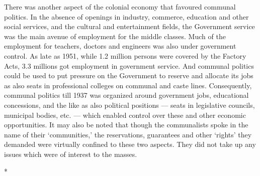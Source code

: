 There was another aspect of the colonial economy that favoured communal politics. In the absence of openings in industry, commerce, education and other social services, and the cultural and entertainment fields, the Government service was the main avenue of employment for the middle classes. Much of the employment for teachers, doctors and engineers was also under government control. As late as 1951, while 1.2 million persons were covered by the Factory Acts, 3.3 millions got employment in government service. And communal politics could be used to put pressure on the Government to reserve and allocate its jobs as also seats in professional colleges on communal and caste lines. Consequently, communal politics till 1937 was organized around government jobs, educational concessions, and the like as also political positions --- seats in legislative councils, municipal bodies, etc. --- which enabled control over these and other economic opportunities. It may also be noted that though the communalists spoke in the name of their `communities,' the reservations, guarantees and other `rights' they demanded were virtually confined to these two aspects. They did not take up any issues which were of interest to the masses.

\begin{center}*\end{center}

\paragraph*{}



